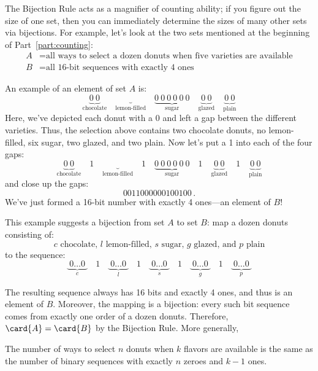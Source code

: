 The Bijection Rule acts as a magnifier of counting ability; if you
figure out the size of one set, then you can immediately determine the
sizes of many other sets via bijections.  For example, let's look at
the two sets mentioned at the beginning of Part~\ref{part:counting}:
%
\begin{align*}
A & = \text{all ways to select a dozen donuts when five varieties are available} \\
B & = \text{all 16-bit sequences with exactly 4 ones}
\end{align*}

An example of an element of set $A$ is:
%
\[
\underbrace{0\ 0}_{\text{chocolate}} \quad
\underbrace{}_{\text{lemon-filled}} \quad
\underbrace{0\ 0\ 0\ 0\ 0\ 0}_{\text{sugar}} \quad
\underbrace{0\ 0}_{\text{glazed}} \quad
\underbrace{0\ 0}_{\text{plain}}
\]
Here, we've depicted each donut with a $0$ and left a gap between
the different varieties.  Thus, the selection above contains two
chocolate donuts, no lemon-filled, six sugar, two glazed, and two
plain.  Now let's put a 1 into each of the four gaps:
\[
\underbrace{0\ 0}_{\text{chocolate}} \quad 1 \quad
\underbrace{}_{\text{lemon-filled}} \quad 1 \quad
\underbrace{0\ 0\ 0\ 0\ 0\ 0}_{\text{sugar}} \quad 1 \quad
\underbrace{0\ 0}_{\text{glazed}} \quad 1 \quad
\underbrace{0\ 0}_{\text{plain}}
\]
and close up the gaps:
\[
0011000000100100 \,.
\]
We've just formed a 16-bit number with exactly 4 ones---an element of
$B$!

This example suggests a bijection from set $A$ to set $B$: map a dozen
donuts consisting of:
%
\[
\text{$c$ chocolate, $l$ lemon-filled, $s$ sugar, $g$ glazed, and $p$ plain}
\]
%
to the sequence:
%
\[
\underbrace{\ 0 \ldots 0\ }_{\text{$c$}} \quad 1 \quad
\underbrace{\ 0 \ldots 0\ }_{\text{$l$}} \quad 1 \quad
\underbrace{\ 0 \ldots 0\ }_{\text{$s$}} \quad 1 \quad
\underbrace{\ 0 \ldots 0\ }_{\text{$g$}} \quad 1 \quad
\underbrace{\ 0 \ldots 0\ }_{\text{$p$}}
\]

The resulting sequence always has 16 bits and exactly 4 ones, and thus
is an element of $B$.  Moreover, the mapping is a bijection: every
such bit sequence comes from exactly one order of a dozen donuts.
Therefore, $\card{A} = \card{B}$ by the Bijection Rule.  More generally,
\begin{lemma}\label{lem:donut_bij}
The number of ways to select $n$ donuts when $k$ flavors are available
is the same as the number of binary sequences with exactly $n$ zeroes
and $k-1$ ones.
\end{lemma}

